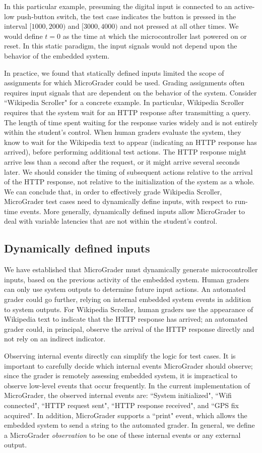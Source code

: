 \documentclass[12pt]{article}
\begin{document}
In this particular example, presuming the digital input is connected to an active-low push-button switch, the test case indicates the button is pressed in the interval $[1000,2000)$ and $[3000,4000)$ and not pressed at all other times.  We would define $t=0$ as the time at which the microcontroller last powered on or reset.  In this static paradigm, the input signals would not depend upon the behavior of the embedded system.

In practice, we found that statically defined inputs limited the scope of assignments for which MicroGrader could be used.  Grading assignments often requires input signals that are dependent on the behavior of the system.  Consider ``Wikipedia Scroller" for a concrete example.  In particular, Wikipedia Scroller requires that the system wait for an HTTP response after transmitting a query.  The length of time spent waiting for the response varies widely and is not entirely within the student's control.  When human graders evaluate the system, they know to wait for the Wikipedia text to appear (indicating an HTTP response has arrived), before performing additional test actions.  The HTTP response might arrive less than a second after the request, or it might arrive several seconds later.  We should consider the timing of subsequent actions relative to the arrival of the HTTP response, not relative to the initialization of the system as a whole.  We can conclude that, in order to effectively grade Wikipedia Scroller, MicroGrader test cases need to dynamically define inputs, with respect to run-time events.  More generally, dynamically defined inputs allow MicroGrader to deal with variable latencies that are not within the student's control.

\subsection{Dynamically defined inputs}
We have established that MicroGrader must dynamically generate microcontroller inputs, based on the previous activity of the embedded system.  Human graders can only use system outputs to determine future input actions.  An automated grader could go further, relying on internal embedded system events in addition to system outputs.  For Wikipedia Scroller, human graders use the appearance of Wikipedia text to indicate that the HTTP response has arrived; an automated grader could, in principal, observe the arrival of the HTTP response directly and not rely on an indirect indicator.

Observing internal events directly can simplify the logic for test cases.  It is important to carefully decide which internal events MicroGrader should observe; since the grader is remotely assessing embedded system, it is impractical to observe low-level events that occur frequently.  In the current implementation of MicroGrader, the observed internal events are: ``System initialized", ``Wifi connected", ``HTTP request sent", ``HTTP response received", and ``GPS fix acquired".  In addition, MicroGrader supports a ``print" event, which allows the embedded system to send a string to the automated grader.  In general, we define a MicroGrader \textit{observation} to be one of these internal events or any external output.
\end{document}
